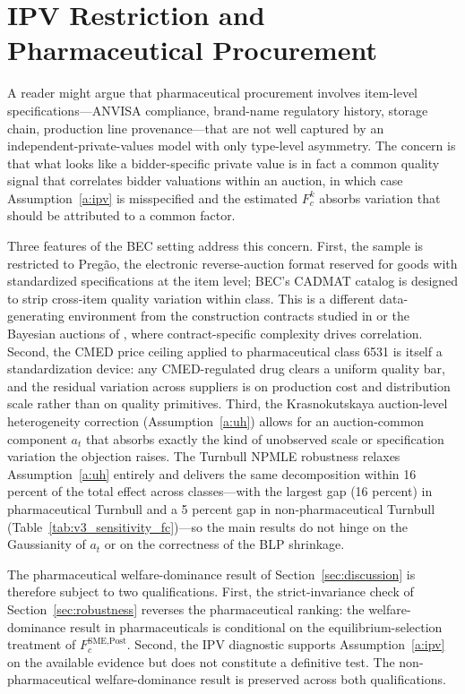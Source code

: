 \section{IPV Restriction and Pharmaceutical Procurement}\label{app:robustness_ipv}

A reader might argue that pharmaceutical procurement involves item-level specifications---ANVISA compliance, brand-name regulatory history, storage chain, production line provenance---that are not well captured by an independent-private-values model with only type-level asymmetry. The concern is that what looks like a bidder-specific private value is in fact a common quality signal that correlates bidder valuations within an auction, in which case Assumption~\ref{a:ipv} is misspecified and the estimated $F_c^k$ absorbs variation that should be attributed to a common factor.

Three features of the BEC setting address this concern. First, the sample is restricted to Preg\~ao, the electronic reverse-auction format reserved for goods with standardized specifications at the item level; BEC's CADMAT catalog is designed to strip cross-item quality variation within class. This is a different data-generating environment from the construction contracts studied in \citet{bajari2014} or the Bayesian auctions of \citet{hendricks2003}, where contract-specific complexity drives correlation. Second, the CMED price ceiling applied to pharmaceutical class 6531 is itself a standardization device: any CMED-regulated drug clears a uniform quality bar, and the residual variation across suppliers is on production cost and distribution scale rather than on quality primitives. Third, the Krasnokutskaya auction-level heterogeneity correction (Assumption~\ref{a:uh}) allows for an auction-common component $a_t$ that absorbs exactly the kind of unobserved scale or specification variation the objection raises. The Turnbull NPMLE robustness relaxes Assumption~\ref{a:uh} entirely and delivers the same decomposition within 16 percent of the total effect across classes---with the largest gap (16 percent) in pharmaceutical Turnbull and a 5 percent gap in non-pharmaceutical Turnbull (Table~\ref{tab:v3_sensitivity_fc})---so the main results do not hinge on the Gaussianity of $a_t$ or on the correctness of the BLP shrinkage.

The pharmaceutical welfare-dominance result of Section~\ref{sec:discussion} is therefore subject to two qualifications. First, the strict-invariance check of Section~\ref{sec:robustness} reverses the pharmaceutical ranking: the welfare-dominance result in pharmaceuticals is conditional on the equilibrium-selection treatment of $F_c^{\text{SME,Post}}$. Second, the IPV diagnostic supports Assumption~\ref{a:ipv} on the available evidence but does not constitute a definitive test. The non-pharmaceutical welfare-dominance result is preserved across both qualifications.

